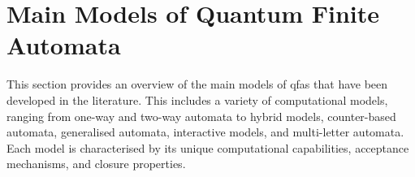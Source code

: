 \section{Main Models of Quantum Finite Automata}
\label{sec:main-models}
This section provides an overview of the main models of \glspl{qfa} that have been developed in the literature. 
This includes a variety of computational models, ranging from one-way and two-way automata to hybrid models, counter-based automata, generalised automata, interactive models, and multi-letter automata.
Each model is characterised by its unique computational capabilities, acceptance mechanisms, and closure properties.









